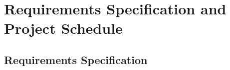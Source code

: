 \chapter{Requirements Specification and Project Schedule}

\theoremstyle{plain}
\theoremsymbol{}
\newtheorem{Rule}[theorem]{Rule}

\pagebreak
\section{Requirements Specification} \label{Requirements Specification}
\enlargethispage{2.5cm}
\begin{adjustwidth}{0.23cm}{0cm} \hfuzz=7.0pt
\end{adjustwidth}
\newpage

